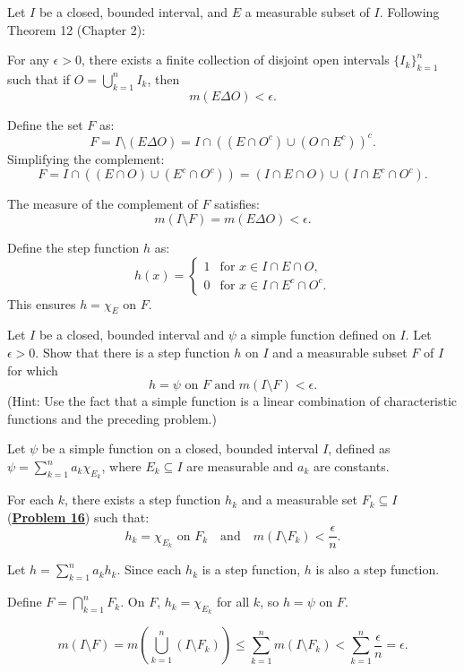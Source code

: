 \begin{solution}
Let \( I \) be a closed, bounded interval, and \( E \) a measurable subset of \( I \). Following Theorem 12 (Chapter 2):

For any \( \epsilon > 0 \), there exists a finite collection of disjoint open intervals \(\{I_k\}_{k=1}^n\) such that if \( O = \bigcup_{k=1}^n I_k \), then  
\[
m(E \Delta O) < \epsilon.
\]

Define the set \( F \) as:  
\[
F = I \setminus (E \Delta O) = I \cap \left( (E \cap O^c) \cup (O \cap E^c) \right)^c.
\]  
Simplifying the complement:  
\[
F = I \cap \left( (E \cap O) \cup (E^c \cap O^c) \right) = (I \cap E \cap O) \cup (I \cap E^c \cap O^c).
\]  

The measure of the complement of \( F \) satisfies:  
\[
m(I \setminus F) = m(E \Delta O) < \epsilon.
\]  

Define the step function \( h \) as:  
\[
h(x) = \begin{cases} 
1 & \text{for } x \in I \cap E \cap O, \\
0 & \text{for } x \in I \cap E^c \cap O^c.
\end{cases}
\]  
This ensures \( h = \chi_E \) on \( F \).  
\end{solution}


\begin{exercise}{17} \label{ex:17}
    Let $I$ be a closed, bounded interval and $\psi$ a simple function defined on $I$. Let $\epsilon > 0$. Show that there is a step function $h$ on $I$ and a measurable subset $F$ of $I$ for which
    \begin{equation*}
        h = \psi \text{ on } F \text{ and } m(I \setminus F) < \epsilon.
    \end{equation*}
    (Hint: Use the fact that a simple function is a linear combination of characteristic functions and the preceding problem.)
\end{exercise}

\begin{solution}
Let \( \psi \) be a simple function on a closed, bounded interval \( I \), defined as \( \psi = \sum_{k=1}^n a_k \chi_{E_k} \), where \( E_k \subseteq I \) are measurable and \( a_k \) are constants.  

   For each \( k \), there exists a step function \( h_k \) and a measurable set \( F_k \subseteq I \) (\hyperref[ex:16]{\underline{\textbf{Problem 16}}}) such that:  
   \[
   h_k = \chi_{E_k} \text{ on } F_k \quad \text{and} \quad m(I \setminus F_k) < \frac{\epsilon}{n}.
   \]  

   Let \( h = \sum_{k=1}^n a_k h_k \). Since each \( h_k \) is a step function, \( h \) is also a step function.  

   Define \( F = \bigcap_{k=1}^n F_k \). On \( F \), \( h_k = \chi_{E_k} \) for all \( k \), so \( h = \psi \) on \( F \).  

   \[
   m(I \setminus F) = m\left(\bigcup_{k=1}^n (I \setminus F_k)\right) \leq \sum_{k=1}^n m(I \setminus F_k) < \sum_{k=1}^n \frac{\epsilon}{n} = \epsilon.
   \]
\end{solution}

